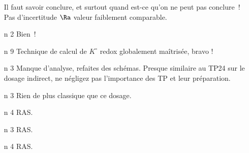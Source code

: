 \documentclass[a4paper, 11pt, final, garamond]{book}
\begin{document}
\begin{enumerate}[label=\sqenumi]
	Il faut savoir conclure, et surtout quand est-ce qu'on ne peut pas
	conclure~! Pas d'incertitude $\Ra$ valeur faiblement comparable.
	\item[n]{2}%
	Bien~!
	\item[n]{9}%
	Technique de calcul de $K^\circ$ redox globalement maîtrisée, bravo !
	\item[n]{3}%
	Manque d'analyse, refaites des schémas. Presque similaire au TP24 sur le
	dosage indirect, ne négligez pas l'importance des TP et leur préparation.
	\item[n]{3}%
	Rien de plus classique que ce dosage.
	\item[n]{4}%
	RAS.
	\item[n]{3}%
	RAS.
	\item[n]{4}%
	RAS.
\end{enumerate}
\end{document}
